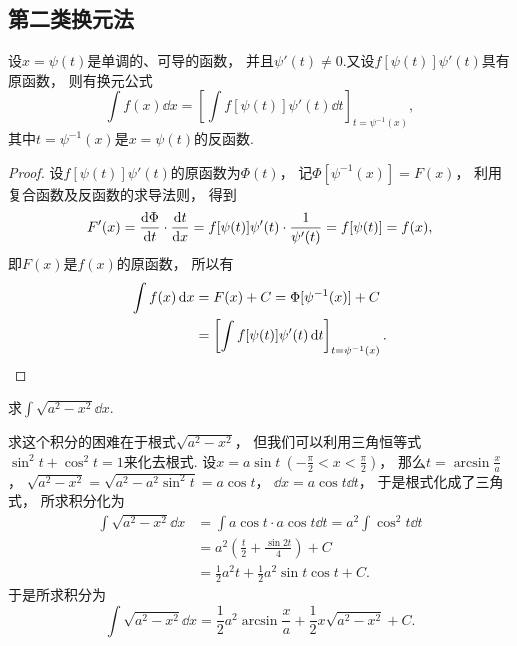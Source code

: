 \subsection{第二类换元法}
\begin{theorem}
设\(x = \psi(t)\)是单调的、可导的函数，
并且\(\psi'(t) \neq 0\).又设\(f[\psi(t)] \psi'(t)\)具有原函数，
则有换元公式\[
	\int f(x) \dd{x}
	= \left[ \int f[\psi(t)] \psi'(t) \dd{t} \right]_{t=\psi^{-1}(x)},
\]
其中\(t=\psi^{-1}(x)\)是\(x=\psi(t)\)的反函数.
\begin{proof}
设\(f[\psi(t)] \psi'(t)\)的原函数为\(\Phi(t)\)，
记\(\Phi[\psi^{-1}(x)] = F(x)\)，
利用复合函数及反函数的求导法则，
得到\[
	F'(x) = \dv{\Phi}{t} \cdot \dv{t}{x}
	= f[\psi(t)] \psi'(t) \cdot \frac{1}{\psi'(t)}
	= f[\psi(t)] = f(x),
\]
即\(F(x)\)是\(f(x)\)的原函数，
所以有\begin{align*}
	\int f(x) \dd{x} &= F(x) + C
	= \Phi[\psi^{-1}(x)] + C \\
	&= \left[ \int f[\psi(t)] \psi'(t) \dd{t} \right]_{t=\psi^{-1}(x)}.
	\qedhere
\end{align*}
\end{proof}
\end{theorem}

\begin{example}
求\(\int \sqrt{a^2 - x^2} \dd{x}\).
\begin{solution}
求这个积分的困难在于根式\(\sqrt{a^2-x^2}\)，
但我们可以利用三角恒等式\(\sin^2t+\cos^2t=1\)来化去根式.
设\(x = a \sin t\ (-\frac{\pi}{2} < x < \frac{\pi}{2})\)，
那么\(t = \arcsin\frac{x}{a}\)，
\(\sqrt{a^2 - x^2} = \sqrt{a^2 - a^2 \sin^2 t} = a \cos t\)，
\(\dd{x} = a \cos t \dd{t}\)，
于是根式化成了三角式，
所求积分化为\begin{align*}
	\int \sqrt{a^2 - x^2} \dd{x}
	&= \int a \cos t \cdot a \cos t \dd{t}
	= a^2 \int \cos^2 t \dd{t} \\
	&= a^2 \left( \frac{t}{2} + \frac{\sin 2t}{4} \right) + C \\
	&= \frac{1}{2} a^2 t + \frac{1}{2} a^2 \sin t \cos t + C.
\end{align*}
于是所求积分为\[
	\int \sqrt{a^2 - x^2} \dd{x}
	= \frac{1}{2} a^2 \arcsin\frac{x}{a} + \frac{1}{2} x \sqrt{a^2 - x^2} + C.
\]
\end{solution}
\end{example}

